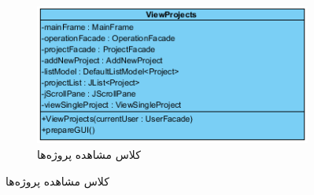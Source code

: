 \begin{figure}[H]
	\centering
	\begin{subfigure}[b]{0.5\textwidth}
		\includegraphics[width=\textwidth]{img/class-design/ui/ViewProjects}
		\caption{کلاس مشاهده پروژه‌ها}
	\end{subfigure}


\end{figure}
